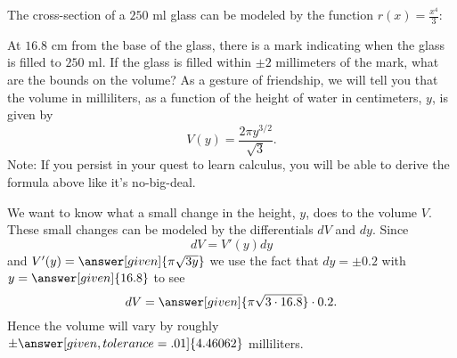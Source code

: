 \documentclass{ximera}
\begin{document}
\begin{example}
  The cross-section of a $250$ ml glass can be modeled by the function
  $r(x) = \frac{x^4}{3}$:
  \begin{image}
  \end{image}
  At $16.8$ cm from the base of the glass, there is a mark indicating
  when the glass is filled to $250$ ml. If the glass is filled within
  $\pm 2$ millimeters of the mark, what are the bounds on the volume?
  As a gesture of friendship, we will tell you that the volume in
  milliliters, as a function of the height of water in centimeters, $y$,
  is given by
  \[
  V(y) = \frac{2\pi y^{3/2}}{\sqrt{3}}.
  \]
  Note: If you persist in your quest to learn calculus, you will be
  able to derive the formula above like it's no-big-deal.
  \begin{explanation}
    We want to know what a small change in the height, $y$, does to the
    volume $V$.  These small changes can be modeled by the
    differentials $dV$ and $dy$. Since
    \[
    dV = V'(y) dy
    \]
    and $V'(y) = \answer[given]{\pi \sqrt{3 y}}$ we use the fact that
    $dy = \pm 0.2$ with $y=\answer[given]{16.8}$ to see
    \[
    dV = \answer[given]{\pi \sqrt{3 \cdot 16.8}} \cdot 0.2.
    \]
    Hence the volume will vary by roughly $\pm\answer[given,tolerance=.01]{4.46062}$
    milliliters.
  \end{explanation}
\end{example}
\end{document}
